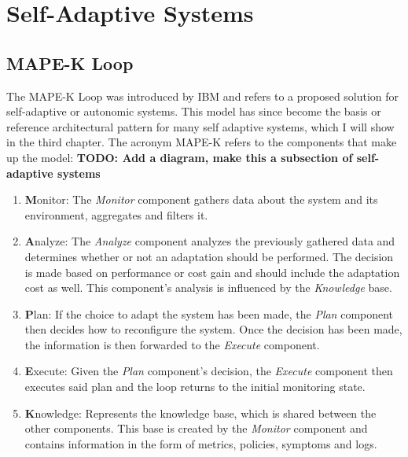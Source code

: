     \section{Self-Adaptive Systems}
    \label{sec:self-adaptive}

    \subsection{MAPE-K Loop}
    \label{sub:mape}
    The MAPE-K Loop was introduced by IBM \cite{Kephart:2003:VAC:642194.642200} and refers to a proposed solution for self-adaptive or autonomic systems.
    This model has since become the basis or reference architectural pattern for many self adaptive systems, which I will show in the third chapter.
    The acronym MAPE-K refers to the components that make up the model:
    \textbf{TODO: Add a diagram, make this a subsection of self-adaptive systems}
    \begin{enumerate}
    \label{enum:mape}
        \item \textbf{M}onitor: 
            The \textit{Monitor} component gathers data about the system and its environment, aggregates and filters it.
        \item \textbf{A}nalyze: 
            The \textit{Analyze} component analyzes the previously gathered data and determines whether or not an adaptation should be performed.
            The decision is made based on performance or cost gain and should include the adaptation cost as well.
            This component's analysis is influenced by the \textit{Knowledge} base.
        \item \textbf{P}lan: 
            If the choice to adapt the system has been made, the \textit{Plan} component then decides how to reconfigure the system.
            Once the decision has been made, the information is then forwarded to the \textit{Execute} component.
        \item \textbf{E}xecute: 
            Given the \textit{Plan} component's decision, the \textit{Execute} component then executes said plan and the loop 
            returns to the initial monitoring state.
        \item \textbf{K}nowledge: 
            Represents the knowledge base, which is shared between the other components.
            This base is created by the \textit{Monitor} component and contains information in the form of metrics, policies, symptoms and logs.
    \end{enumerate}

